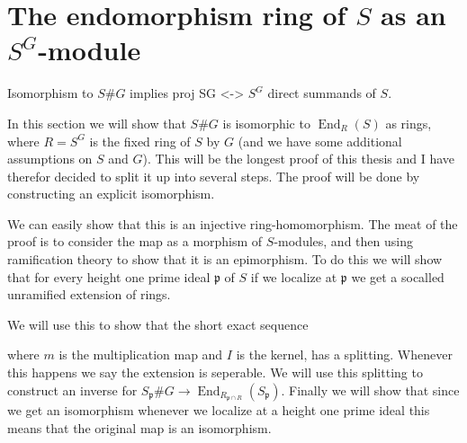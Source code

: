 \documentclass[11pt, a4paper, english]{article}
\numberwithin{prop}{section}
\numberwithin{lemma}{section}
\numberwithin{theorem}{section}
\numberwithin{defin}{section}
\numberwithin{example}{section}
\DeclareMathOperator{\End}{End}
\begin{document}
\section{The endomorphism ring of $S$ as an $S^G$-module}
Isomorphism to $S\#G$ implies proj SG <-> $S^G$ direct summands of $S$.

In this section we will show that $S\#G$ is isomorphic to $\End_R(S)$ as rings, where $R = S^G$ is the fixed ring of $S$ by $G$ (and we have some additional assumptions on $S$ and $G$). This will be the longest proof of this thesis and I have therefor decided to split it up into several steps. The proof will be done by constructing an explicit isomorphism.
\begin{center}
\end{center}
We can easily show that this is an injective ring-homomorphism. The meat of the proof is to consider the map as a morphism of $S$-modules, and then using ramification theory to show that it is an epimorphism. To do this we will show that for every height one prime ideal $\mathfrak{p}$ of $S$ if we localize at $\mathfrak{p}$ we get a socalled unramified extension of rings.
\begin{center}
\end{center}
We will use this to show that the short exact sequence
\begin{center}
\end{center}
where $m$ is the multiplication map and $I$ is the kernel, has a splitting. Whenever this happens we say the extension is seperable. We will use this splitting to construct an inverse for $S_\mathfrak{p}\#G \to \End_{R_{\mathfrak{p} \cap R}}(S_\mathfrak{p})$. Finally we will show that since we get an isomorphism whenever we localize at a height one prime ideal this means that the original map is an isomorphism.
\end{document}
